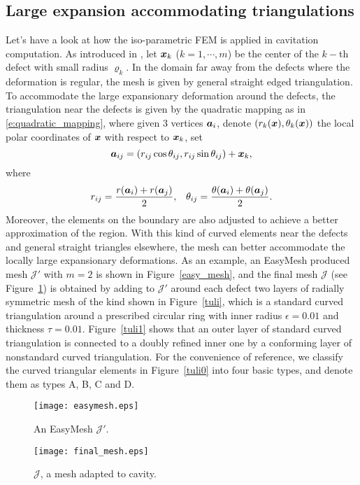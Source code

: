 \documentclass[12pt]{article}
\renewcommand{\vec}[1]{\mbox{\boldmath$#1$}}
\numberwithin{equation}{section}
\begin{document}
\subsection{Large expansion accommodating triangulations}
Let's have a look at how the iso-parametric FEM is applied in cavitation computation. As
introduced in \cite{Lian and Li iso}, let $\vec{x}_k$ ($k=1,\cdots,m$) be the center of
the $k-$th defect with small radius $\varrho_k$. In the domain far away from the defects
where the deformation is regular, the mesh is given by general straight edged triangulation.
To accommodate the large expansionary deformation
around the defects, the triangulation near the defects is given by the quadratic mapping
as in \eqref{e:quadratic_mapping}, where given 3 vertices $\vec{a}_i$, denote
$(r_k(\vec{x}),\theta_k(\vec{x}))$ the local polar coordinates of $\vec{x}$ with
respect to $\vec{x}_k$, set
\begin{equation}
  \label{eq:make_curved_mesh}
  \vec{a}_{ij}=(r_{ij}\cos\theta_{ij},r_{ij}\sin\theta_{ij})+\vec{x}_k,
\end{equation}
where
\begin{equation*}
 r_{ij}=\frac{r(\vec{a}_i)+r(\vec{a}_j)}{2},\;\;\;
 \theta_{ij}=\frac{\theta(\vec{a}_i)+\theta(\vec{a}_j)}{2}.
 \end{equation*}
Moreover, the elements on the boundary are also adjusted to achieve a better
approximation of the region. With this kind
of curved elements near the defects and general straight triangles elsewhere, the
mesh can better accommodate the locally large expansionary deformations. As an example,
an EasyMesh produced mesh $\mathcal{J'}$ with $m=2$ is shown in
Figure~\ref{easy_mesh}, and the final mesh $\mathcal{J}$ (see Figure~\ref{final_mesh})
is obtained by adding to $\mathcal{J'}$ around each defect two layers of
radially symmetric mesh of the kind shown in Figure~\ref{tuli}, which is a standard curved
triangulation around a prescribed circular ring with inner radius $\epsilon = 0.01$
and thickness $\tau =0.01$. Figure~\ref{tuli1} shows that an outer layer of standard curved
triangulation is connected to a doubly refined inner one by a conforming layer of
nonstandard curved triangulation. For the convenience of reference, we
classify the curved triangular elements in Figure~\ref{tuli0} into four basic types,
and denote them as types A, B, C and D.

\begin{figure}[ht!]
     \begin{minipage}[l]{0.5\textwidth}
 \centering \texttt{[image: easymesh.eps]}
 \caption{An EasyMesh $\mathcal{J'}$.} \label{easy_mesh}
 \end{minipage}
\begin{minipage}[l]{0.5\textwidth}
 \centering \texttt{[image: final\_mesh.eps]}
 \caption{$\mathcal{J}$, a mesh adapted to cavity.} \label{final_mesh}
\end{minipage}
\end{figure}
\end{document}

